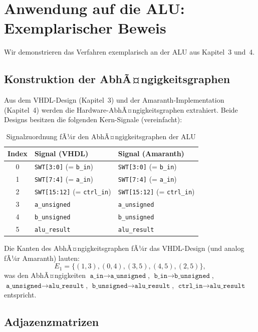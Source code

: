 ﻿\documentclass[12pt,a4paper]{report}
\begin{document}
\section{Anwendung auf die ALU: Exemplarischer Beweis}
\label{subsec:alu_beispiel}

Wir demonstrieren das Verfahren exemplarisch an der ALU aus Kapitel~3 und~4.

\subsection{Konstruktion der AbhÃ¤ngigkeitsgraphen}

Aus dem VHDL-Design (Kapitel~3) und der Amaranth-Implementation (Kapitel~4) werden die Hardware-AbhÃ¤ngigkeitsgraphen extrahiert. Beide Designs besitzen die folgenden Kern-Signale (vereinfacht):

\begin{table}[H]
\centering
\begin{tabular}{|c|l|l|}
\hline
\textbf{Index} & \textbf{Signal (VHDL)} & \textbf{Signal (Amaranth)} \\
\hline
0 & \texttt{SWT[3:0]} (= \texttt{b\_in}) & \texttt{SWT[3:0]} (= \texttt{b\_in}) \\
1 & \texttt{SWT[7:4]} (= \texttt{a\_in}) & \texttt{SWT[7:4]} (= \texttt{a\_in}) \\
2 & \texttt{SWT[15:12]} (= \texttt{ctrl\_in}) & \texttt{SWT[15:12]} (= \texttt{ctrl\_in}) \\
3 & \texttt{a\_unsigned} & \texttt{a\_unsigned} \\
4 & \texttt{b\_unsigned} & \texttt{b\_unsigned} \\
5 & \texttt{alu\_result} & \texttt{alu\_result} \\
\hline
\end{tabular}
\caption{Signalzuordnung fÃ¼r den AbhÃ¤ngigkeitsgraphen der ALU}
\end{table}

Die Kanten des AbhÃ¤ngigkeitsgraphen fÃ¼r das VHDL-Design (und analog fÃ¼r Amaranth) lauten:
\[
E_1 = \{(1,3), (0,4), (3,5), (4,5), (2,5)\},
\]
was den AbhÃ¤ngigkeiten $\texttt{a\_in} \to \texttt{a\_unsigned}$, $\texttt{b\_in} \to \texttt{b\_unsigned}$, $\texttt{a\_unsigned} \to \texttt{alu\_result}$, $\texttt{b\_unsigned} \to \texttt{alu\_result}$, $\texttt{ctrl\_in} \to \texttt{alu\_result}$ entspricht.

\subsection{Adjazenzmatrizen}
\end{document}
